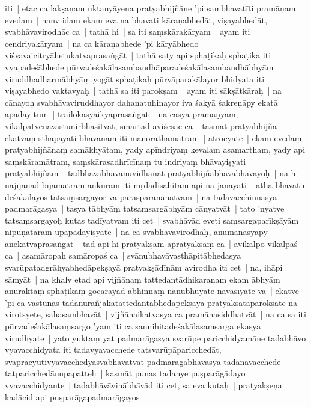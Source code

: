 \documentclass[article,a4paper]{memoir}
\begin{document}
	  \pstart iti | etac ca lakṣaṇam uktanyā\-yena pratyabhijñā\-ne 'pi sambhavatī\-ti pramā\-ṇam evedam | \label{thakur75-113.14} nanv idam ekam eva na bhavati kā\-raṇabhedā\-t, viṣayabhedā\-t, svabhā\-vavirodhā\-c ca | \label{thakur75-113.14a} tathā\- hi | sa iti saṃskā\-rakā\-ryam | ayam iti cendriyakā\-ryam | na ca kā\-raṇabhede 'pi kā\-ryā\-bhedo viśvavaicitryā\-hetukatvaprasaṅgā\-t | \label{thakur75-113.16} tathā\- saty api sphaṭikaḥ sphaṭika iti vyapadeśā\-bhede pū\-rvadeśakā\-lasambandhā\-paradeśakā\-lasambandhā\-bhyā\-ṃ viruddhadharmā\-bhyā\-ṃ yogā\-t sphaṭikaḥ pū\-rvā\-parakā\-layor bhidyata iti viṣayabhedo vaktavyaḥ | \label{thakur75-113.18} tathā\- sa iti parokṣam | ayam iti sā\-kṣā\-tkā\-raḥ | na cā\-nayoḥ svabhā\-vaviruddhayor dahanatuhinayor iva śakyā\- śakreṇā\-py ekatā\- ā\-pā\-dayitum | trailokasyaikyaprasaṅgā\-t | \label{thakur75-113.20} na cā\-sya prā\-mā\-ṇyam, vikalpatvenā\-vastunirbhā\-sitvā\-t, smā\-rtā\-d aviśeṣā\-c ca | tasmā\-t pratyabhijñā\- ekatvaṃ sthā\-payati bhā\-vā\-nā\-m iti manorathamā\-tram | \label{thakur75-113.23} atrocyate | ekam evedaṃ pratyabhijñā\-naṃ samā\-khyā\-tam, \label{thakur75-113.23a} yady apī\-ndriyaṃ kevalam asamartham, yady api saṃskā\-ramā\-tram, saṃskā\-rasadhrī\-cī\-naṃ tu indriyaṃ bhā\-vayiṣyati pratyabhijñā\-m | tadbhā\-vā\-bhā\-vā\-nuvidhā\-nā\-t pratyabhijñā\-bhā\-vā\-bhā\-vayoḥ | na hi nā\-jī\-janad bī\-jamā\-tram aṅkuram iti mṛdā\-disahitam api na janayati | \label{thakur75-113.26} atha bhavatu deśakā\-layos tatsaṃsargayor vā\- parasparanā\-nā\-tvam | na tadavacchinnasya padmarā\-gasya | tasya tā\-bhyā\-ṃ tatsaṃsargā\-bhyā\-ṃ cā\-nyatvā\-t | \label{thakur75-113.29} tato 'nyatve tatsaṃsargayoḥ kutas tadī\-yatvam iti cet | svabhā\-vā\-d eveti saṃsargaparī\-kṣā\-yā\-ṃ nipuṇataram upapā\-dayiṣyate | \label{thakur75-113.30} na ca svabhā\-vavirodhaḥ, anumā\-nasyā\-py anekatvaprasaṅgā\-t | tad api hi pratyakṣam apratyakṣaṃ ca | avikalpo vikalpaś ca | asamā\-ropaḥ samā\-ropaś ca | \label{thakur75-113.32} svā\-nubhavā\-vasthā\-pitā\-bhedasya svarū\-patadgrā\-hyabhedā\-pekṣayā\- pratyakṣā\-dī\-nā\-m avirodha iti cet | na, ihā\-pi sā\-myā\-t | na khalv etad api vijñā\-naṃ tattedantā\-dhikaraṇam ekam ā\-bhyā\-m anuraktaṃ sphaṭikaṃ gocarayad abhinnaṃ nā\-nubhū\-yate nā\-vasī\-yate vā\- | ekatve 'pi ca vastunas tadanurañjakatattedantā\-bhedā\-pekṣayā\- pratyakṣatā\-parokṣate na virotsyete, sahasambhavā\-t | vijñā\-naikatvasya ca pramā\-ṇasiddhatvā\-t | \label{thakur75-114.3} na ca sa iti pū\-rvadeśakā\-lasaṃsargo 'yam iti ca sannihitadeśakā\-lasaṃsarga ekasya virudhyate | yato yuktaṃ yat padmarā\-gasya svarū\-pe paricchidyamā\-ne tadabhā\-vo vyavacchidyata iti tadavyavacchede tatsvarū\-pā\-paricchedā\-t, svapracyutivyavacchedyasvabhā\-vatvā\-t padmarā\-gabhā\-vasya tadanavacchede tatparicchedā\-nupapatteḥ | \label{thakur75-114.8} kasmā\-t punas tadanye puṣparā\-gā\-dayo vyavacchidyante | tadabhā\-vā\-vinā\-bhā\-vā\-d iti cet, sa eva kutaḥ | pratyakṣeṇa kadā\-cid api puṣparā\-gapadmarā\-gayos 
\end{document}
